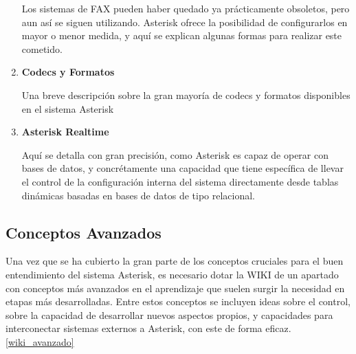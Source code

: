 \begin{enumerate}
	Los sistemas de FAX pueden haber quedado ya prácticamente obsoletos, pero aun así se siguen utilizando. Asterisk ofrece la posibilidad de configurarlos en mayor o menor medida, y aquí se explican algunas formas para realizar este cometido.
	
	\item \textbf{Codecs y Formatos}
	
	Una breve descripción sobre la gran mayoría de codecs y formatos disponibles en el sistema Asterisk
	
	\item \textbf{Asterisk Realtime}
	
	Aquí se detalla con gran precisión, como Asterisk es capaz de operar con bases de datos, y concrétamente una capacidad que tiene específica de llevar el control de la configuración interna del sistema directamente desde tablas dinámicas basadas en bases de datos de tipo relacional.
	
\end{enumerate}


\subsection{Conceptos Avanzados}

Una vez que se ha cubierto la gran parte de los conceptos cruciales para el buen entendimiento del sistema Asterisk, es necesario dotar la WIKI de un apartado con conceptos más avanzados en el aprendizaje que suelen surgir la necesidad en etapas más desarrolladas. Entre estos conceptos se incluyen ideas sobre el control, sobre la capacidad de desarrollar nuevos aspectos propios, y capacidades para interconectar sistemas externos a Asterisk, con este de forma eficaz. \ref{wiki_avanzado}


